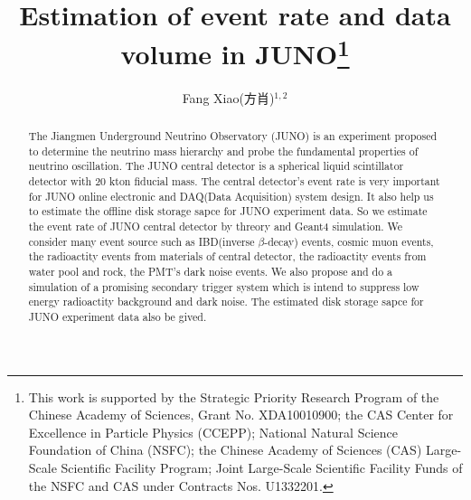\documentclass[a4paper,10pt,twoside]{paper}
\begin{document}

	\title{Estimation of event rate and data volume in JUNO\thanks{This work is supported by the Strategic Priority Research Program of the Chinese Academy of Sciences, Grant No. XDA10010900; the CAS Center for Excellence in Particle Physics (CCEPP); National Natural Science Foundation of China (NSFC); the Chinese Academy of Sciences (CAS) Large-Scale Scientific Facility Program; Joint Large-Scale Scientific Facility Funds of the NSFC and CAS under Contracts Nos. U1332201.} }


	\author{Fang Xiao(方肖)$^{1,2}$
	}
	\maketitle

	\address{
		$^1$ School of Physics, Sichuan University, Chengdu 610065 , China\\
		$^2$ Institute of High Energy Physics, Chinese Academy of Sciences, Beijing 100049, China\\
	}

	\begin{abstract}
		The Jiangmen Underground Neutrino Observatory (JUNO) is an experiment proposed to determine
		the neutrino mass hierarchy and probe the fundamental properties of neutrino oscillation. 
		The JUNO central detector is a spherical liquid scintillator detector with 20 kton fiducial mass. 
		The central detector's event rate is very important for JUNO online 
		electronic and DAQ(Data Acquisition)
		system design. It also help us to estimate the offline disk storage sapce for JUNO experiment data.
		So we estimate the event rate of JUNO central detector by threory and Geant4 simulation. 
		We consider many event source such
		as IBD(inverse $\beta$-decay) events, cosmic muon events, the radioactity events from materials of
		central detector, the radioactity events from water pool and rock, the PMT's dark noise events.
		We also propose and do a simulation of a promising secondary trigger system which is intend to
		suppress low energy 
		radioactity background and dark noise. The estimated disk storage sapce for JUNO experiment data
		also be gived.

	\end{abstract}
\end{document}
